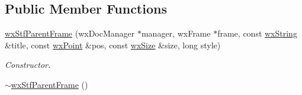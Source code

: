 \subsection*{Public Member Functions}
\begin{DoxyCompactItemize}
\item 
\hyperlink{classwxStfParentFrame_ab056026ad9666ef70a5e88619c38afca}{wxStfParentFrame} (wxDocManager $\ast$manager, wxFrame $\ast$frame, const \hyperlink{classwxString}{wxString} \&title, const \hyperlink{classwxPoint}{wxPoint} \&pos, const \hyperlink{classwxSize}{wxSize} \&size, long style)
\begin{DoxyCompactList}\small\item\em Constructor. \item\end{DoxyCompactList}\item 
\hypertarget{classwxStfParentFrame_aef3536f2ef30bed918e16b294ccd6cb2}{
\hyperlink{classwxStfParentFrame_aef3536f2ef30bed918e16b294ccd6cb2}{$\sim$wxStfParentFrame} ()}
\label{classwxStfParentFrame_aef3536f2ef30bed918e16b294ccd6cb2}


\end{DoxyCompactItemize}
